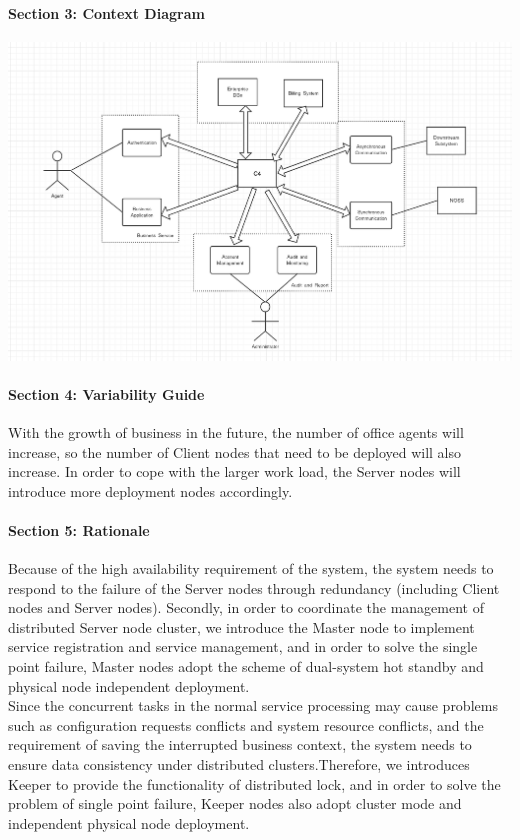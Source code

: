 \documentclass{article}
\begin{document}
			\paragraph{Section 3: Context Diagram}
			\begin{center}
			\includegraphics[scale=0.3]{deployment2.png}
			\end{center}
			\paragraph{Section 4: Variability Guide}
			With the growth of business in the future, the number of office agents will increase, so the number of Client nodes that need to be deployed will also increase. In order to cope with the larger work load, the Server nodes will introduce more deployment nodes accordingly.
			\paragraph{Section 5: Rationale}
			Because of the high availability requirement of the system, the system needs to respond to the failure of the Server nodes through redundancy (including Client nodes and Server nodes). Secondly, in order to coordinate the management of distributed Server node cluster, we introduce the Master node to implement service registration and service management, and in order to solve the single point failure, Master nodes adopt the scheme of dual-system hot standby and physical node independent deployment.\\
			Since the concurrent tasks in the normal service processing may cause problems such as configuration requests conflicts and system resource conflicts, and the requirement of saving the interrupted business context, the system needs to ensure data consistency under distributed clusters.Therefore, we introduces Keeper to provide the functionality of distributed lock, and in order to solve the problem of single point failure, Keeper nodes also adopt cluster mode and independent physical node deployment.
			
\end{document}

